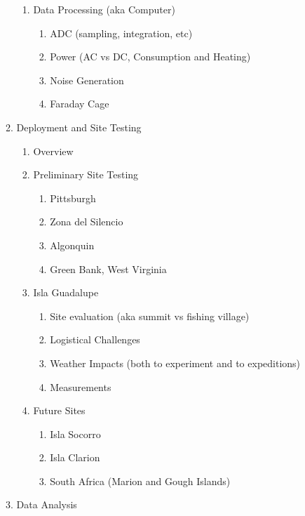 \documentclass[12pt,twoside]{report}
\begin{document}
\begin{enumerate}
\begin{enumerate}
\begin{enumerate}
\item Data Processing (aka Computer)

\begin{enumerate}
\item ADC (sampling, integration, etc)
\item Power (AC vs DC, Consumption and Heating)
\item Noise Generation
\item Faraday Cage
\end{enumerate}

\end{enumerate}

\item Deployment and Site Testing

\begin{enumerate}
\item Overview
\item Preliminary Site Testing

\begin{enumerate}
\item Pittsburgh
\item Zona del Silencio
\item Algonquin 
\item Green Bank, West Virginia
\end{enumerate}

\item Isla Guadalupe

\begin{enumerate}
\item Site evaluation (aka summit vs fishing village)
\item Logistical Challenges
\item Weather Impacts (both to experiment and to expeditions)
\item Measurements 
\end{enumerate}

\item Future Sites

\begin{enumerate}
\item Isla Socorro
\item Isla Clarion
\item South Africa (Marion and Gough Islands)
\end{enumerate}

\end{enumerate}

\item Data Analysis


\end{enumerate}
\end{enumerate}
\end{document}
